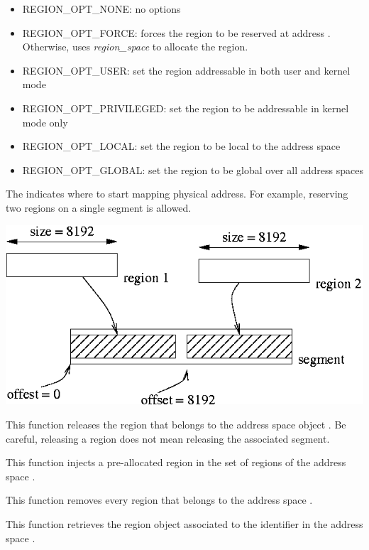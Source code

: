 \begin{itemize}
{	   \begin{itemize}
	     \item {REGION\_OPT\_NONE}: no options
	     \item {REGION\_OPT\_FORCE}: forces the region to be reserved at address . Otherwise, uses \emph{region\_space} to allocate the region.
	     \item {REGION\_OPT\_USER}: set the region addressable in both user and kernel mode
	     \item {REGION\_OPT\_PRIVILEGED}: set the region to be addressable in kernel mode only
	     \item {REGION\_OPT\_LOCAL}: set the region to be local to the address space
	     \item {REGION\_OPT\_GLOBAL}: set the region to be global over all address spaces
	   \end{itemize}
	   The  indicates where to start mapping
	   physical address. For example, reserving two regions on a
	   single segment is allowed.
	   \begin{center}
	     \includegraphics[width=0.4\linewidth]{figures/offset}
	   \end{center}
	 }

	 {
	   This function releases the region  that
	   belongs to the address space object . Be
	   careful, releasing a region does not mean releasing the
	   associated segment.
	 }

	 {
	   This function injects a pre-allocated region in the set of
	   regions of the address space .
	 }

	 {
	   This function removes every region that belongs to the
	   address space .
	 }

		  {
		    This function retrieves the region object
		     associated to the identifier
		     in the address space
		    .
		  }


\end{itemize}
